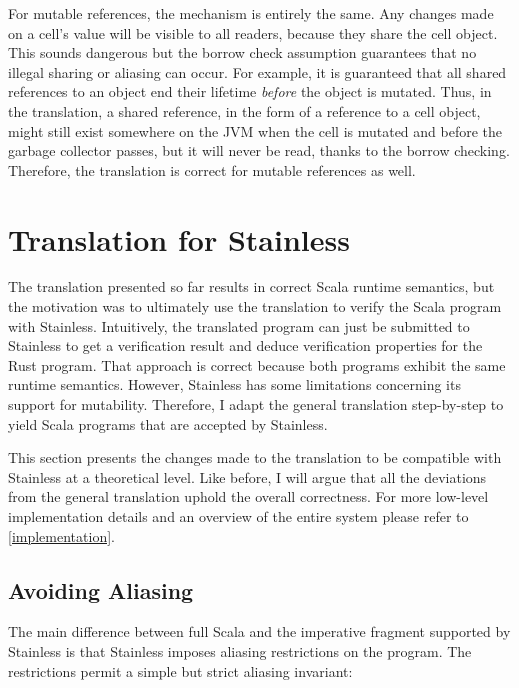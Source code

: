 For mutable references, the mechanism is entirely the same. Any changes made on
a cell's value will be visible to all readers, because they share the cell
object. This sounds dangerous but the borrow check assumption guarantees that no
illegal sharing or aliasing can occur. For example, it is guaranteed that all
shared references to an object end their lifetime \emph{before} the object is
mutated. Thus, in the translation, a shared reference, in the form of a
reference to a cell object, might still exist somewhere on the JVM when the cell
is mutated and before the garbage collector passes, but it will never be read,
thanks to the borrow checking. Therefore, the translation is correct for mutable
references as well.


\section{Translation for Stainless}

The translation presented so far results in correct Scala runtime semantics, but
the motivation was to ultimately use the translation to verify the Scala program
with Stainless. Intuitively, the translated program can just be submitted to
Stainless to get a verification result and deduce verification properties for
the Rust program. That approach is correct because both programs exhibit the
same runtime semantics. However, Stainless has some limitations concerning its
support for mutability. Therefore, I adapt the general translation step-by-step
to yield Scala programs that are accepted by Stainless.

This section presents the changes made to the translation to be compatible with
Stainless at a theoretical level. Like before, I will argue  that all the
deviations from the general translation uphold the overall correctness. For more
low-level implementation details and an overview of the entire system please
refer to \autoref{implementation}.



\subsection{Avoiding Aliasing}
\label{sec:aliasing-restrictions}

The main difference between full Scala and the imperative fragment supported by
Stainless \cite[section ``Imperative'']{stainless-doc} is that Stainless imposes
aliasing restrictions on the program. The restrictions permit a simple but
strict aliasing invariant:

